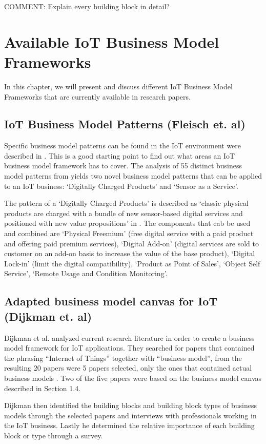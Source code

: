 		COMMENT: Explain every building block in detail?
	
\section{Available IoT Business Model Frameworks}

In this chapter, we will present and discuss different IoT Business Model Frameworks that are currently available in research papers.

	\subsection{IoT Business Model Patterns (Fleisch et. al)}
		Specific business model patterns can be found in the IoT environment were described in \cite{fleisch}. This is a good starting point to find out what areas an IoT business model framework has to cover. The analysis of 55 distinct business model patterns from \cite{gassmann55} yields two novel business model patterns that can be applied to an IoT business: `Digitally Charged Products' and `Sensor as a Service'.

		The pattern of a `Digitally Charged Products' is described as `classic physical products are charged with a bundle
		of new sensor-based digital services and positioned with new value propositions' in \cite[p. 10]{fleisch}. The components that cab be used and combined are `Physical Freemium' (free digital service with a paid product and offering paid premium services), `Digital Add-on' (digital services are sold to customer on an add-on basis to increase the value of the base product), `Digital Lock-in' (limit the digital compatibility), `Product as Point of Sales', `Object Self Service', `Remote Usage and Condition Monitoring'. 

	\subsection{Adapted business model canvas for IoT (Dijkman et. al)}
		Dijkman et al. analyzed current research literature in order to create a business model framework for IoT applications. They searched for papers that contained the phrasing ``Internet of Things'' together with ``business model'', from the resulting 20 papers were 5 papers selected, only the ones that contained actual business models \cite{dijkman}. Two of the five papers were based on the business model canvas described in Section 1.4.

		Dijkman then identified the building blocks and building block types of business models through the selected papers and interviews with professionals working in the IoT business. Lastly he determined the relative importance of each building block or type through a survey.

